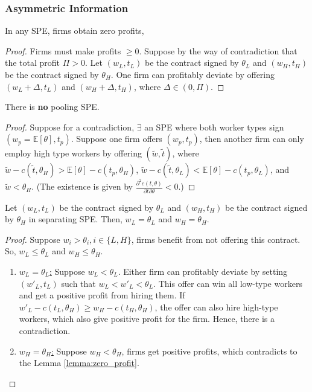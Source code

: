 \documentclass[11pt]{elegantbook_2}
\begin{document}
\subsubsection*{Asymmetric Information}
\begin{lemma}\label{lemma:zero_profit}
    In any SPE, firms obtain zero profits,
\end{lemma}
\begin{proof}
    Firms must make profits $\geq 0$. Suppose by the way of contradiction that the total profit $\Pi>0$. Let $(w_L,t_L)$ be the contract signed by $\theta_L$ and $(w_H,t_H)$ be the contract signed by $\theta_H$. One firm can profitably deviate by offering $(w_L+\Delta,t_L)$ and $(w_H+\Delta,t_H)$, where $\Delta \in (0,\Pi)$.
\end{proof}

\begin{lemma}
    There is \textbf{no} pooling SPE.
\end{lemma}
\begin{proof}
    Suppose for a contradiction, $\exists$ an SPE where both worker types sign $(w_p=\mathbb{E}[\theta],t_p)$. Suppose one firm offers $(w_p,t_p)$, then another firm can only employ high type workers by offering $(\tilde{w},\tilde{t})$, where $\tilde{w}-c(\tilde{t},\theta_H)>\mathbb{E}[\theta]-c(t_p,\theta_H)$, $\tilde{w}-c(\tilde{t},\theta_L)<\mathbb{E}[\theta]-c(t_p,\theta_L)$, and $\tilde{w}<\theta_H$. (The existence is given by $\frac{\partial^2 c(t,\theta)}{\partial t\partial \theta}<0$.)
\end{proof}

\begin{lemma}
    Let $(w_L,t_L)$ be the contract signed by $\theta_L$ and $(w_H,t_H)$ be the contract signed by $\theta_H$ in separating SPE. Then, $w_L=\theta_L$ and $w_H=\theta_H$.
\end{lemma}
\begin{proof}
    Suppose $w_i>\theta_i,i\in\{L,H\}$, firms benefit from not offering this contract. So, $w_L\leq \theta_L$ and $w_H\leq \theta_H$.
    \begin{enumerate}
        \item \underline{$w_L=\theta_L$:} Suppose $w_L<\theta_L$. Either firm can profitably deviate by setting $(w'_L,t_L)$ such that $w_L<w'_L<\theta_L$. This offer can win all low-type workers and get a positive profit from hiring them. If $w'_L-c(t_L,\theta_H)\geq w_H-c(t_H,\theta_H)$, the offer can also hire high-type workers, which also give positive profit for the firm. Hence, there is a contradiction.
        \item \underline{$w_H=\theta_H$:} Suppose $w_H<\theta_H$, firms get positive profits, which contradicts to the Lemma \ref{lemma:zero_profit}.
    \end{enumerate}
\end{proof}
\end{document}
